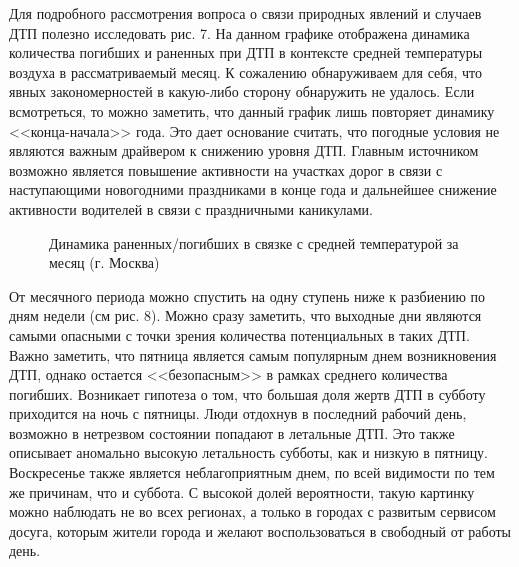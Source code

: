 \documentclass[a4paper, 14pt]{article}
\begin{document}
Для подробного рассмотрения вопроса о связи природных явлений и случаев ДТП полезно исследовать рис. 7. На данном графике отображена динамика количества погибших и раненных при ДТП в контексте средней температуры воздуха в рассматриваемый месяц. К сожалению обнаруживаем для себя, что явных закономерностей в какую-либо сторону обнаружить не удалось. Если всмотреться, то можно заметить, что данный график лишь повторяет динамику <<конца-начала>> года. Это дает основание считать, что погодные условия не являются важным драйвером к снижению уровня ДТП. Главным источником возможно является повышение активности на участках дорог в связи с наступающими новогодними праздниками в конце года и дальнейшее снижение активности водителей в связи с праздничными каникулами. 

\begin{figure}[h]
	\caption{Динамика раненных/погибших в связке с средней температурой за месяц (г. Москва)}
\end{figure}

От месячного периода можно спустить на одну ступень ниже к разбиению по дням недели (см рис. 8). Можно сразу заметить, что выходные дни являются самыми опасными с точки зрения количества потенциальных в таких ДТП. Важно заметить, что пятница является самым популярным днем возникновения ДТП, однако остается <<безопасным>> в рамках среднего количества погибших. Возникает гипотеза о том, что большая доля жертв ДТП в субботу приходится на ночь с пятницы. Люди отдохнув в последний рабочий день, возможно в нетрезвом состоянии попадают в летальные ДТП. Это также описывает аномально высокую летальность субботы, как и низкую в пятницу. Воскресенье также является неблагоприятным днем, по всей видимости по тем же причинам, что и суббота. С высокой долей вероятности, такую картинку можно наблюдать не во всех регионах, а только в городах с развитым сервисом досуга, которым жители города и желают воспользоваться в свободный от работы день.
\end{document}
